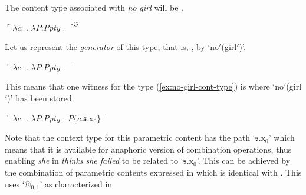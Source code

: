 The content type associated with \textit{no girl} will be \nexteg{}.
\begin{ex} 
  $\ulcorner\lambda c$: . $\lambda
  P$:\textit{Ppty} . $\urcorner^{\mathfrak{S}}$
  \label{ex:no-girl-cont-type}
\end{ex}
Let us represent the \textit{generator} of this type, that is,
\nexteg{}, by `no$'$(girl$'$)'.
\begin{ex} 
  $\ulcorner\lambda c$: . $\lambda
  P$:\textit{Ppty} . $\urcorner$ 
\end{ex}
This means that one witness for the type (\ref{ex:no-girl-cont-type})
is \nexteg{} where `no$'$(girl$'$)' has been stored.
\begin{ex} 
$\ulcorner\lambda c$: . $\lambda
  P$:\textit{Ppty} . $P\{c.\mathfrak{s}.\text{x}_0\}\urcorner$ 
\end{ex} 
Note that the context type for this parametric content has the path
`$\mathfrak{s}$.x$_0$' which means that it is available for anaphoric
version of combination operations, thus enabling \textit{she} in
\textit{thinks she failed} to be related to
`$\mathfrak{s}$.x$_0$'. This can be achieved by the combination of
parametric contents expressed in  which is identical with
.  This uses `@$_{0,1}$' as characterized in
